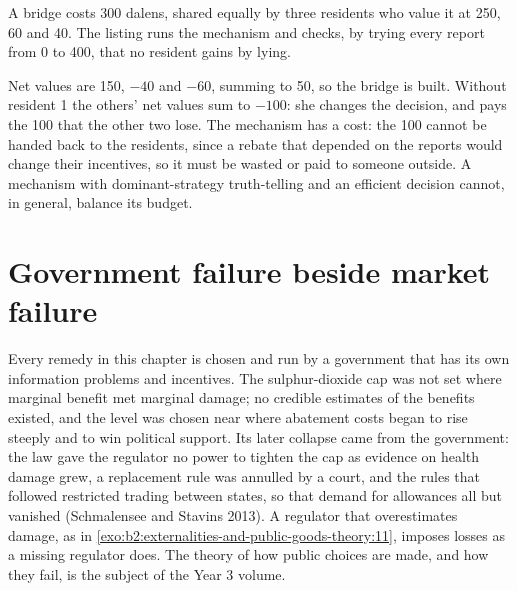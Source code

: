 A bridge costs 300 dalens, shared equally by three residents who value it at 250, 60 and 40. The listing
runs the mechanism and checks, by trying every report from 0 to 400, that no resident gains by lying.

\label{lst:b2:externalities-and-public-goods-theory:pivot}

\label{out:b2:externalities-and-public-goods-theory:pivot}

Net values are 150, $-40$ and $-60$, summing to 50, so the bridge is built. Without resident 1 the others' net values sum to $-100$: she changes
the decision, and pays the 100 that the other two lose. The mechanism has a cost: the 100 cannot be handed back to the
residents, since a rebate that depended on the reports would change their incentives, so it must be wasted or paid to
someone outside. A mechanism with dominant-strategy truth-telling and an efficient decision cannot, in general, balance its
budget.

\section{Government failure beside market failure}\label{sec:b2:externalities-and-public-goods-theory:government}

Every remedy in this chapter is chosen and run by a government that has its own information problems and incentives. The
sulphur-dioxide cap was not set where marginal benefit met marginal damage; no credible estimates of the benefits existed,
and the level was chosen near where abatement costs began to rise steeply and to win political support. Its later
collapse came from the government: the law gave the regulator no power to tighten the cap as evidence on health damage
grew, a replacement rule was annulled by a court, and the rules that followed restricted trading between states, so that
demand for allowances all but vanished (Schmalensee and Stavins 2013). A regulator that overestimates damage, as in
\cref{exo:b2:externalities-and-public-goods-theory:11}, imposes losses as a missing regulator does. The theory of how
public choices are made, and how they fail, is the subject of the Year 3 volume.

